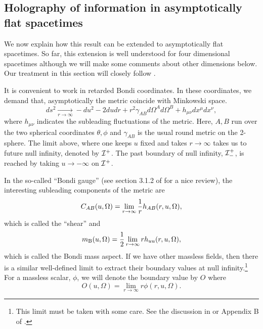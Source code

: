 \documentclass[12pt]{article}
\newcommand{\be}{\begin{equation}}
\newcommand{\ee}{\end{equation}}
\def \sph{{\Omega}}
\def \scrip{{\cal I}^{+}}
\def \scrippast{{\cal I}^{+}_{-}}
\def\maspect{m_{\text{B}}}
\begin{document}
\subsection{Holography of information in asymptotically flat spacetimes \label{holinfoflat}}
We now explain how this result can be extended to asymptotically flat spacetimes. So far, this extension is well understood for four dimensional spacetimes although we will make some comments about other dimensions below. Our treatment in this section will closely follow \cite{Laddha:2020kvp}.

It is convenient to work in retarded Bondi coordinates. In these coordinates, we demand that, asymptotically the metric coincide with Minkowski space.
\be
ds^2 \underset{r \rightarrow \infty}{\longrightarrow}  - du^2 - 2 du dr + r^2 \gamma_{AB}d \sph^{A} d \sph^{B}  + h_{\mu \nu} d x^{\mu} d x^{\nu},
\ee
where $h_{\mu \nu}$ indicates the subleading fluctuations of the metric. Here, $A,B$ run over the two spherical coordinates $\theta, \phi$ and $\gamma_{AB}$ is the usual round metric on the 2-sphere. The limit above, where one keeps $u$ fixed and takes $r \rightarrow \infty$ takes us to future null infinity, denoted by $\scrip$.  The past boundary of null infinity, $\scrippast$, is reached by taking $u \rightarrow -\infty$ on $\scrip$.


In the so-called ``Bondi gauge'' (see section 3.1.2 of \cite{Compere:2018aar} for a nice review), the interesting subleading components of the metric are
\be
C_{AB}(u, \Omega) = \lim_{r \rightarrow \infty} {1 \over r} h_{AB}(r, u, \Omega),
\ee
which is called the ``shear'' and
\be
\maspect(u, \Omega) = {1 \over 2} \lim_{r \rightarrow \infty} r h_{u u}(r, u, \Omega),
\ee
which is called the Bondi mass aspect. If we have other massless fields, then there is a similar well-defined limit to extract their boundary values at null infinity.\footnote{This limit must be taken with some care. See the discussion in \cite{Strominger:2017zoo} or Appendix B of \cite{Ghosh:2017pel}.} For a massless scalar, $\phi$, we
will denote the boundary value by $O$ where
\be
O(u, \Omega) = \lim_{r \rightarrow \infty} r \phi(r, u, \Omega).
\ee
\end{document}
